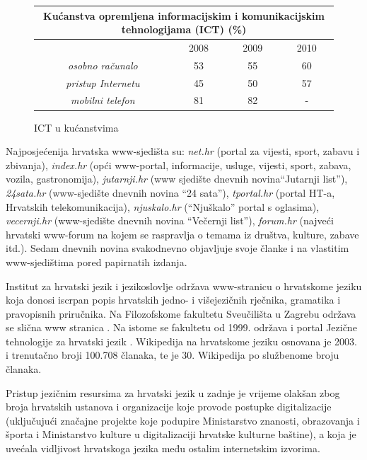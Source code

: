 \begin{multicols}{2}
\begin{figure}[htb]
\centering
	\begin{tabular}{|c|c|c|c|}
        \hline
      \multicolumn{4}{|c|}{\textbf{Kućanstva opremljena informacijskim i komunikacijskim tehnologijama (ICT) (\%)}} \\ \hline
        ~                                              & 2008 & 2009 & 2010 \\ \hline
        \emph{osobno računalo}   & 53   & 55   & 60   \\ \hline
        \emph{pristup Internetu} & 45   & 50   & 57   \\ \hline
        \emph{mobilni telefon}   & 81   & 82   & -    \\
        \hline
   \end{tabular}
  \caption{ICT u kućanstvima}
  \label{fig:IST_kuc}
\end{figure}

Najposjećenija hrvatska www-sjedišta su: \emph{net.hr} (portal za vijesti, sport, zabavu i zbivanja), \emph{index.hr} (opći www-portal, informacije, usluge, vijesti, sport, zabava, vozila, gastronomija), \emph{jutarnji.hr} (www sjedište dnevnih novina“Jutarnji list”), \emph{24sata.hr} (www-sjedište dnevnih novina “24 sata”), \emph{tportal.hr} (portal HT-a, Hrvatskih telekomunikacija), \emph{njuskalo.hr} (“Njuškalo” portal s oglasima), \emph{vecernji.hr} (www-sjedište dnevnih novina “Večernji list”), \emph{forum.hr} (najveći hrvatski www-forum na kojem se raspravlja o temama iz društva, kulture, zabave itd.). Sedam dnevnih novina svakodnevno objavljuje svoje članke i na vlastitim www-sjedištima pored papirnatih izdanja.


Institut za hrvatski jezik i jezikoslovlje održava www-stranicu o hrvatskome jeziku koja donosi iscrpan popis hrvatskih jedno- i višejezičnih rječnika, gramatika i pravopisnih priručnika. Na Filozofskome fakultetu Sveučilišta u Zagrebu održava se slična www stranica \cite{str11}. Na istome se fakultetu od 1999. održava i portal Jezične tehnologije za hrvatski jezik \cite{str12}.
Wikipedija na hrvatskome jeziku osnovana je 2003. i trenutačno broji 100.708 članaka, te je 30. Wikipedija po službenome broju članaka.

Pristup jezičnim resursima za hrvatski jezik u zadnje je vrijeme olakšan zbog broja hrvatskih ustanova i organizacije koje provode postupke digitalizacije (uključujući značajne projekte koje podupire Ministarstvo znanosti, obrazovanja i športa i Ministarstvo kulture u digitalizaciji hrvatske kulturne baštine), a koja je uvećala vidljivost hrvatskoga jezika među ostalim internetskim izvorima.
\end{multicols}

